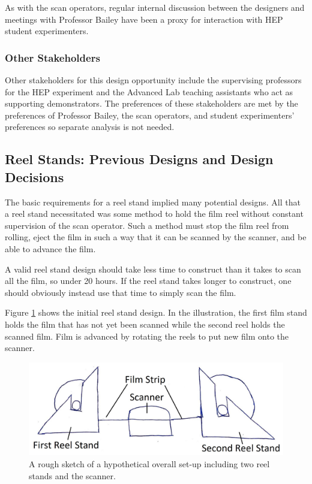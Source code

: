 \documentclass[12pt]{article} %
\begin{document}
As with the scan operators, regular internal discussion between the designers and meetings with Professor Bailey have been a proxy for interaction with HEP student experimenters.

\subsubsection{Other Stakeholders}
Other stakeholders for this design opportunity include the supervising professors for the HEP experiment and the Advanced Lab teaching assistants who act as supporting demonstrators. The preferences of these stakeholders are met by the preferences of Professor Bailey, the scan operators, and student experimenters' preferences so separate analysis is not needed.

\subsection{Reel Stands: Previous Designs and Design Decisions}
The basic requirements for a reel stand implied many potential designs. All that a reel stand necessitated was some method to hold the film reel without constant supervision of the scan operator. Such a method must stop the film reel from rolling, eject the film in such a way that it can be scanned by the scanner, and be able to advance the film.

A valid reel stand design should take less time to construct than it takes to scan  all the film, so under 20 hours. If the reel stand takes longer to construct, one should obviously instead use that time to simply scan the film.

Figure \ref{fig: whole set up} shows the initial reel stand design. In the illustration, the first film stand holds the film that has not yet been scanned while the second reel holds the scanned film. Film is advanced by rotating the reels to put new film onto the scanner.
\begin{figure}[htb]
    \centering
    \includegraphics[width=0.7\linewidth]{Images/whole set up.jpg}
    \caption{A rough sketch of a hypothetical overall set-up including two reel stands and the scanner.}
    \label{fig: whole set up}
\end{figure}
\end{document}

